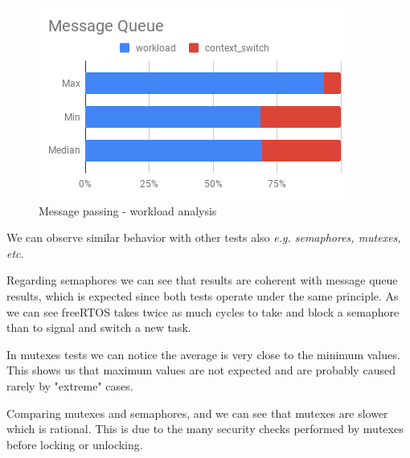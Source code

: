 \documentclass[conference]{IEEEtran}
\begin{document}


\vspace{-5.00mm}
\begin{figure}[!htbp]
    \centerline{\includegraphics[width=0.7\columnwidth]{graphs/rpi/Message_Queue_stacked_3.png}}
    \caption{Message passing - workload analysis}
    \label{fig:mq_stacked}
\end{figure}

We can observe similar behavior with other tests also \textit{e.g. semaphores, mutexes, etc}.

Regarding semaphores we can see that results are coherent with message queue results, which is expected since both tests operate under the same principle. As we can see freeRTOS takes twice as much cycles to take and block a semaphore than to signal and switch a new task.

In mutexes tests we can notice the average is very close to the minimum values. This shows us that maximum values are not expected and are probably caused rarely by "extreme" cases. 

Comparing mutexes and semaphores,  and  we can see that mutexes are slower which is rational. This is due to the many security checks performed by mutexes before locking or unlocking.

\end{document}
